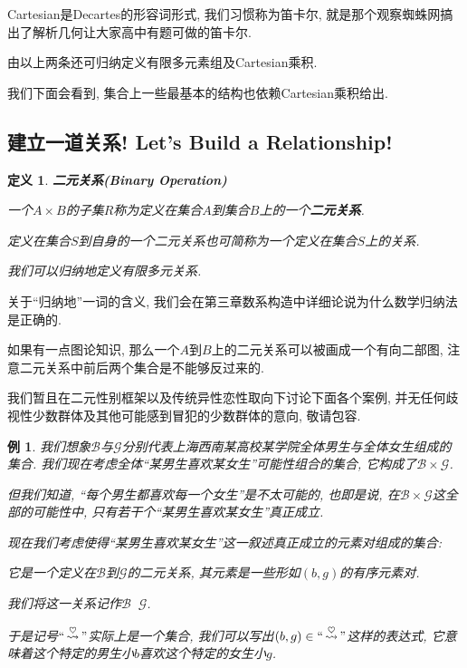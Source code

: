 \documentclass[UTF8]{ctexart}
\newcommand{\<}{\langle}
\renewcommand{\>}{\rangle}
\DeclareMathOperator{\like}{\overset{\heartsuit}{\leadsto}}
\newtheorem{dfn}[thm]{定义}
\newtheorem{xmp}{例}[subsection]
\begin{document}
            Cartesian是Decartes的形容词形式, 我们习惯称为笛卡尔, 就是那个观察蜘蛛网搞出了解析几何让大家高中有题可做的笛卡尔. 

            由以上两条还可归纳定义有限多元素组及Cartesian乘积. 
            
            我们下面会看到, 集合上一些最基本的结构也依赖Cartesian乘积给出. 

        \subsection{建立一道关系! Let's Build a Relationship! }
            
            \begin{dfn}
                \textbf{二元关系(Binary Operation)}

                一个$A\times B$的子集$R$称为定义在集合$A$到集合$B$上的一个\textbf{二元关系}. 

                定义在集合$S$到自身的一个二元关系也可简称为一个定义在集合$S$上的关系. 

                我们可以归纳地定义有限多元关系. 
            \end{dfn}

            关于``归纳地''一词的含义, 我们会在第三章数系构造中详细论说为什么数学归纳法是正确的. 

            如果有一点图论知识, 那么一个$A$到$B$上的二元关系可以被画成一个有向二部图, 注意二元关系中前后两个集合是不能够反过来的. 
            
            {\scriptsize 我们暂且在二元性别框架以及传统异性恋性取向下讨论下面各个案例, 并无任何歧视性少数群体及其他可能感到冒犯的少数群体的意向, 敬请包容. }
            
            \begin{xmp}
                我们想象$\mathcal{B}$与$\mathcal{G}$分别代表上海西南某高校某学院全体男生与全体女生组成的集合. 我们现在考虑全体``某男生喜欢某女生''可能性组合的集合, 它构成了$\mathcal{B}\times\mathcal{G}$. 

                但我们知道, ``每个男生都喜欢每一个女生''是不太可能的, 也即是说, 在$\mathcal{B}\times\mathcal{G}$这全部的可能性中, 只有若干个``某男生喜欢某女生''真正成立. 

                现在我们考虑使得``某男生喜欢某女生''这一叙述真正成立的元素对组成的集合: 
                
                它是一个定义在$\mathcal{B}$到$\mathcal{G}$的二元关系, 其元素是一些形如$(b,g)$的有序元素对. 
                
                我们将这一关系记作$\mathcal{B}\like\mathcal{G}$. 

                于是记号$``\like"$实际上是一个集合, 我们可以写出$(b,g)\in``\like"$这样的表达式, 它意味着这个特定的男生小$b$喜欢这个特定的女生小$g$.     
            \end{xmp}
\end{document}
